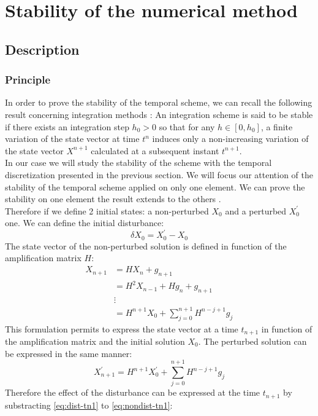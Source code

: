 \section{Stability of the numerical method}
\subsection{Description}
\subsubsection{Principle}
In order to prove the stability of the temporal scheme, we can recall the following result concerning integration methods \cite{Geradin}: An integration scheme is said to be stable if there exists an integration step $h_0 > 0$ so that for any $h \in [0, h_0]$, a finite variation of the state vector at time $t^n$ induces only a non-increasing variation of the state vector $X^{n+1}$ calculated at a subsequent instant $t^{n+1}$.\\
In our case we will study the stability of the scheme with the temporal discretization presented in the previous section. We will focus our attention of the stability of the temporal scheme applied on only one element. We can prove the stability on one element the result extends to the others \cite{Belytschko}. \\
Therefore if we define 2 initial states: a non-perturbed $X_0$  and a perturbed $X^\prime_0$ one. We can define the initial disturbance:
\begin{equation}
\delta X_0 = X^\prime_0 - X_0
\end{equation}
The state vector of the non-perturbed solution is defined in function of the amplification matrix $H$:
\begin{align}
X_{n+1} &= H X_n + g_{n+1} \\
&= H^2 X_{n-1} + Hg_n + g_{n+1} \\
&\vdots\\
&= H^{n+1}X_0 + \sum^{n+1}_{j=0} H^{n-j+1}g_j
\label{eq:nondist-tn1}
\end{align}
This formulation permits to express the state vector at a time $t_{n+1}$ in function of the amplification matrix and the initial solution $X_0$. The perturbed solution can be expressed in the same manner:
\begin{equation}
X^\prime_{n+1} = H^{n+1}X_0^\prime + \sum^{n+1}_{j=0} H^{n-j+1}g_j
\label{eq:dist-tn1}
\end{equation}
Therefore the effect of the disturbance can be expressed at the time $t_{n+1}$ by substracting \ref{eq:dist-tn1} to \ref{eq:nondist-tn1}:
